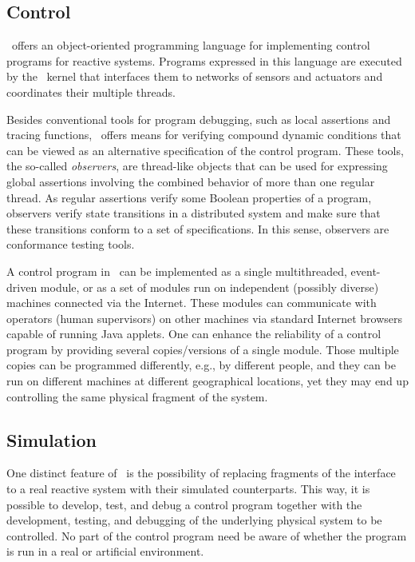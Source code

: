 \subsection{Control}
\label{rm_in_rv}

\smurph\ offers an
object-oriented programming language for implementing control programs for
reactive systems.
Programs expressed in this language are executed by the \smurph\ kernel that
interfaces them to networks of sensors and actuators and coordinates their
multiple threads.

Besides conventional tools for program debugging, such as local
assertions and tracing functions, \smurph\ offers means for
verifying compound dynamic conditions that can be viewed as an alternative
specification of the control program.
These tools, the so-called {\em observers},
are thread-like objects that can be used for expressing global
assertions involving the combined behavior of more than one regular thread.
As regular assertions verify some Boolean properties of a program, observers
verify state transitions in a distributed system and make sure that these
transitions conform to a set of specifications.
In this sense, observers are conformance testing tools.

A control program in \smurph\ can be implemented as a single multithreaded,
event-driven module, or as a set of modules run on independent (possibly
diverse) machines connected via the Internet.
These modules can communicate with operators (human supervisors)
on other machines via standard Internet browsers capable of running Java
applets.
One can enhance the reliability of a
control program by providing several copies/versions of a single module.
Those multiple copies can be programmed differently, e.g., by different people,
and they can be run on different machines at different geographical locations,
yet they may end up controlling the same physical fragment of the system.

\subsection{Simulation}
\label{rm_in_si}

One distinct feature of \smurph\ is the possibility of replacing fragments of
the interface to a real reactive system with their simulated counterparts.
This way, it is possible to develop, test, and debug a control program
together with the development, testing, and debugging of the underlying
physical system to be controlled.
No part of the control program need be aware of whether the program is run in
a real or artificial environment.

